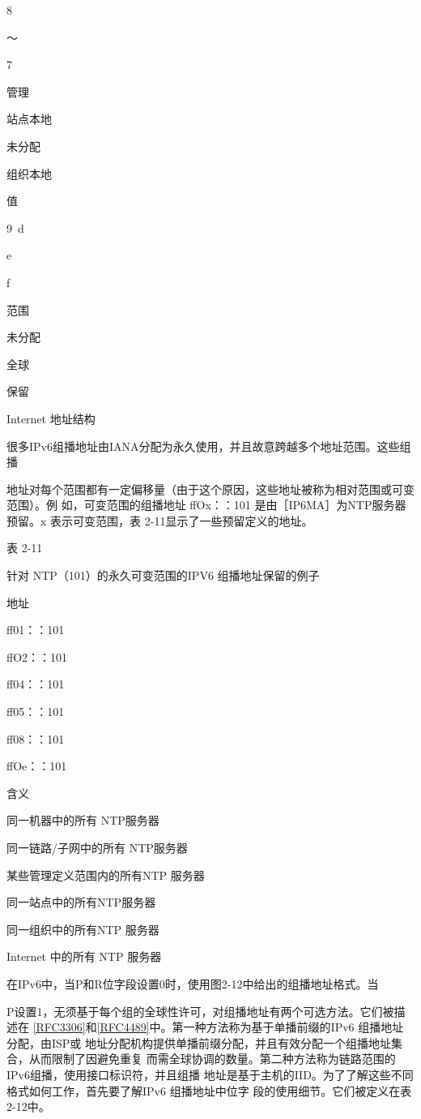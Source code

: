 8

～

7

管理

站点本地

未分配

组织本地

值

9~d

e

f

范围

未分配

全球

保留

Internet 地址结构

很多IPv6组播地址由IANA分配为永久使用，并且故意跨越多个地址范围。这些组播

地址对每个范围都有一定偏移量（由于这个原因，这些地址被称为相对范围或可变范围）。例
如，可变范围的组播地址 ffOx：：101 是由［IP6MA］为NTP服务器预留。x 表示可变范围，表
2-11显示了一些预留定义的地址。

表 2-11

针对 NTP（101）的永久可变范围的IPV6 组播地址保留的例子

地址

ff01：：101

ffO2：：101

ff04：：101

ff05：：101

ff08：：101

ffOe：：101

含义

同一机器中的所有 NTP服务器

同一链路/子网中的所有 NTP服务器

某些管理定义范围内的所有NTP 服务器

同一站点中的所有NTP服务器

同一组织中的所有NTP 服务器

Internet 中的所有 NTP 服务器

在IPv6中，当P和R位字段设置0时，使用图2-12中给出的组播地址格式。当

P设置1，无须基于每个组的全球性许可，对组播地址有两个可选方法。它们被描述在
\href{https://www.rfc-editor.org/rfc/rfc3306}{[RFC3306]}和\href{https://www.rfc-editor.org/rfc/rfc4489}{[RFC4489]}中。第一种方法称为基于单播前缀的IPv6 组播地址分配，由ISP或
地址分配机构提供单播前缀分配，并且有效分配一个组播地址集合，从而限制了因避免重复
而需全球协调的数量。第二种方法称为链路范围的IPv6组播，使用接口标识符，并且组播
地址是基于主机的IID。为了了解这些不同格式如何工作，首先要了解IPv6 组播地址中位字
段的使用细节。它们被定义在表2-12中。

